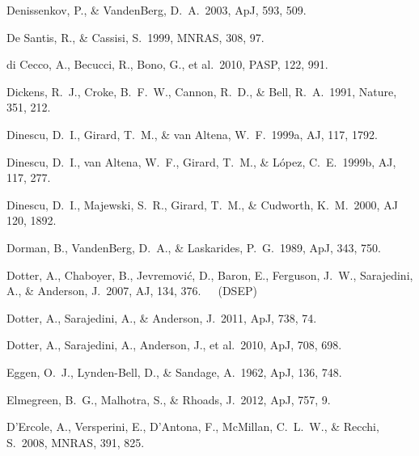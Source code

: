 \documentclass[12pt,preprint]{aastex}
\begin{document}
\begin{thebibliography}{}
Denissenkov, P., \& VandenBerg, D.~A.~2003, ApJ, 593, 509.

De Santis, R., \& Cassisi, S.~1999, MNRAS, 308, 97.

di Cecco, A., Becucci, R., Bono, G., et al.~2010, PASP, 122, 991.

Dickens, R.~J., Croke, B.~F.~W., Cannon, R.~D., \& Bell, R.~A.~1991, Nature,
 351, 212.

Dinescu, D.~I., Girard, T.~M., \& van Altena, W.~F.~1999a, AJ, 117, 1792.

Dinescu, D.~I., van Altena, W.~F., Girard, T.~M., \& L\'opez, C.~E.~1999b,
 AJ, 117, 277.

Dinescu, D.~I., Majewski, S.~R., Girard, T.~M., \& Cudworth, K.~M.~2000,
 AJ 120, 1892.

Dorman, B., VandenBerg, D.~A., \& Laskarides, P.~G.~1989, ApJ, 343, 750.

Dotter, A., Chaboyer, B., Jevremovi\'c, D., Baron, E., Ferguson, J.~W., 
 Sarajedini, A., \& Anderson, J.~2007, AJ, 134, 376.\ \ \ (DSEP)


Dotter, A., Sarajedini, A., \& Anderson, J.~2011, ApJ, 738, 74.

Dotter, A., Sarajedini, A., Anderson, J., et al.~2010, ApJ, 708, 698.


Eggen, O.~J., Lynden-Bell, D., \& Sandage, A.~1962, ApJ, 136, 748.

Elmegreen, B.~G., Malhotra, S., \& Rhoads, J.~2012, ApJ, 757, 9.

D'Ercole, A., Versperini, E., D'Antona, F., McMillan, C.~L.~W., \& Recchi,
 S.~2008, MNRAS, 391, 825.


\end{thebibliography}
\end{document}
